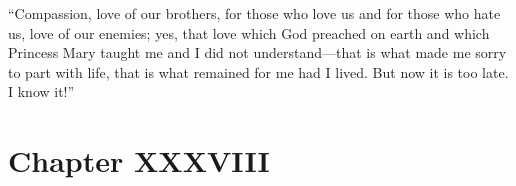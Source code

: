 ``Compassion, love of our brothers, for those who love us and for
those who hate us, love of our enemies; yes, that love which God
preached on earth and which Princess Mary taught me and I did not
understand---that is what made me sorry to part with life, that
is what remained for me had I lived. But now it is too late. I
know it!''


\chapter*{Chapter XXXVIII} \ifaudio {}
\fi

